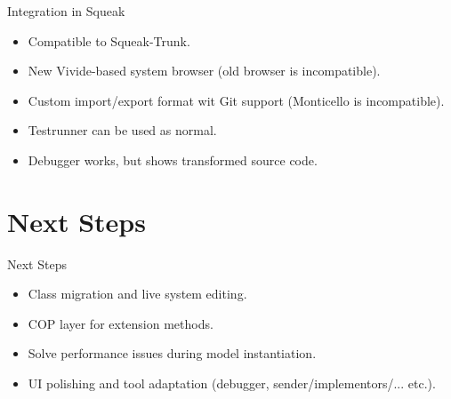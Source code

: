 \documentclass[xcolor=dvipsname, handout]{beamer} %
\begin{document}
\begin{frame}{Integration in Squeak}
\begin{itemize}
  \item Compatible to Squeak-Trunk.
  \item New Vivide-based system browser (old browser is incompatible).
  \item Custom import/export format wit Git support (Monticello is incompatible).
  \item Testrunner can be used as normal.
  \item Debugger works, but shows transformed source code.
\end{itemize}
\end{frame}

\section{Next Steps}
\begin{frame}{Next Steps}
  \begin{itemize}
    \item Class migration and live system editing.
    \item COP layer for extension methods.
    \item Solve performance issues during model instantiation.
    \item UI polishing and tool adaptation (debugger, sender/implementors/... etc.).
  \end{itemize}
\end{frame}
\end{document}

